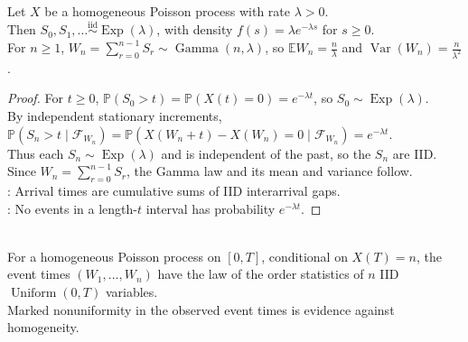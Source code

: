 \begin{theorem} \label{thm:poisson-interarrival-exponential} \\
Let $X$ be a homogeneous Poisson process with rate $\lambda>0$.\\
Then $S_0,S_1,\ldots\stackrel{\mathrm{iid}}{\sim}\operatorname{Exp}(\lambda)$, with density $f(s)=\lambda e^{-\lambda s}$ for $s\geq0$.\\
For $n\geq1$, $W_n=\sum\limits_{r=0}^{n-1}S_r\sim\operatorname{Gamma}(n,\lambda)$, so $\mathbb{E}W_n=\frac{n}{\lambda}$ and $\operatorname{Var}(W_n)=\frac{n}{\lambda^2}$.
\begin{proof} For $t\geq0$, $\mathbb{P}(S_0>t)=\mathbb{P}(X(t)=0)=e^{-\lambda t}$, so $S_0\sim\operatorname{Exp}(\lambda)$.\\
By independent stationary increments, $\mathbb{P}(S_n>t\mid\mathcal{F}_{W_n})=\mathbb{P}(X(W_n+t)-X(W_n)=0\mid\mathcal{F}_{W_n})=e^{-\lambda t}$.\\
Thus each $S_n\sim\operatorname{Exp}(\lambda)$ and is independent of the past, so the $S_n$ are IID.\\
Since $W_n=\sum\limits_{r=0}^{n-1}S_r$, the Gamma law and its mean and variance follow.\\
: Arrival times are cumulative sums of IID interarrival gaps.\\
: No events in a length-$t$ interval has probability $e^{-\lambda t}$.
\end{proof}
\end{theorem}

\begin{remark} \label{rem:poisson-event-times-uniform-diagnostic} \\
For a homogeneous Poisson process on $[0,T]$, conditional on $X(T)=n$, the event times $(W_1,\ldots,W_n)$ have the law of the order statistics of $n$ IID $\operatorname{Uniform}(0,T)$ variables.\\
Marked nonuniformity in the observed event times is evidence against homogeneity.
\end{remark}

